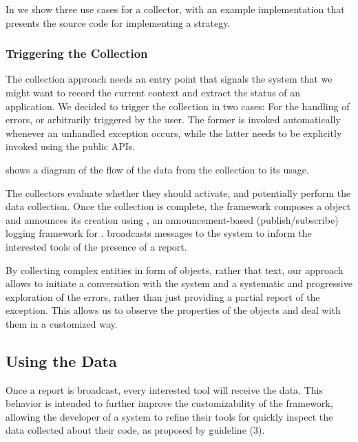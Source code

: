 
In  we show three use cases for a collector, with an example implementation that presents the source code for implementing a strategy.


\subsubsection{Triggering the Collection}

The collection approach needs an entry point that signals the system that we might want to record the current context and extract the status of an application.
We decided to trigger the collection in two cases: For the handling of errors, or arbitrarily triggered by the user.
The former is invoked automatically whenever an unhandled exception occurs, while the latter needs to be explicitly invoked using the \sln public APIs.

 shows a diagram of the flow of the data from the collection to its usage.

The collectors evaluate whether they should activate, and potentially perform the data collection.
Once the collection is complete, the framework composes a  object and announces its creation using \bea, an announcement-based (\ie publish/subscribe) logging framework for \pha.
\bea broadcasts messages to the system to inform the interested tools of the presence of a report.

By collecting complex entities in form of objects, rather that text, our approach allows to initiate a conversation with the system and a systematic and progressive exploration of the errors, rather than just providing a partial report of the exception.
This allows us to observe the properties of the objects and deal with them in a customized way.

\subsection{Using the Data}\label{sec:reified-tools}

Once a report is broadcast, every interested tool will receive the data.
This behavior is intended to further improve the customizability of the framework, allowing the developer of a system to refine their tools for quickly inspect the data collected about their code, as proposed by guideline (3).


